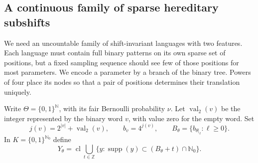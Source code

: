 \documentclass[11pt,reqno]{amsart}
\numberwithin{equation}{section}
\theoremstyle{definition}
\theoremstyle{definition}
\newcommand{\N}{\mathbb N}
\newcommand{\Nzero}{\mathbb N_0}
\newcommand{\supp}{\operatorname{supp}}
\begin{document}
\subsection{A continuous family of sparse hereditary subshifts}

We need an uncountable family of shift-invariant languages with two
features. Each language must contain full binary patterns on its own
sparse set of positions, but a fixed sampling sequence should see few
of those positions for most parameters. We encode a parameter by a
branch of the binary tree. Powers of four place its nodes so that a
pair of positions determines their translation uniquely.

Write $\Theta=\{0,1\}^{\N}$, with its fair Bernoulli probability
$\nu$. Let $\operatorname{val}_2(v)$ be the integer represented by
the binary word $v$, with value zero for the empty word. Set
\[
 j(v)=2^{|v|}+\operatorname{val}_2(v),\qquad
 b_v=4^{j(v)},\qquad
 B_\theta=\{b_{\theta|_\ell}:\ell\ge0\}.
\]
In $K=\{0,1\}^{\Nzero}$ define
\[
 Y_\theta=
 \operatorname{cl}\bigcup_{t\in\mathbb Z}
 \{y:\supp(y)\subset(B_\theta+t)\cap\Nzero\}.
\]
\end{document}
